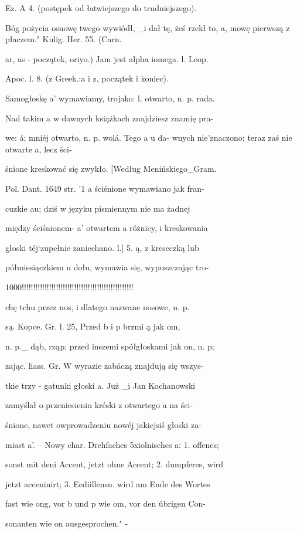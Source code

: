   Ez. A 4. (postępek od łatwiejszego do trudniejszego).

  Bóg pożycia osnowę twego wywiódł, _i dał tę, żeś rzekł
to,
  a, mowę pierwszą z płaczem." Kulig. Her. 55. (Carn.

  ar, as - początek, oriyo.) Jam jest alpha iomega. l. Leop.

  Apoc. l. 8. (z Greek.:a i z, początek i koniec).


Samogłoskę a' wymawiamy, trojako: l. otwarto, n. p. rada.

  Nad takim a w dawnych książkach znajdziesz znamię pra-

  we: á; mniéj otwarto, n. p. wolá.
Tego a u da-
  wnych nie'znaczono; teraz zaś nie otwarte a, lecz ści-

  śnione kreskować się zwykło. [Według Menińskiego_Gram.

  Pol. Dant. 1649 str. '1 a ściśnione wymawiano jak fran-

  cuzkie au; dziś w języku pismiennym nie ma żadnej

  między ściśnionem- a' otwartem a różnicy, i kreskowania

  głoski téj`zupełnie 	zaniechano. l.] 5. ą, z kreseczką lub

  półmiesiączkiem u dołu, wymawia się, wypuszczając tro-

  1000!!!!!!!!!!!!!!!!!!!!!!!!!!!!!!!!!!!!!!!!!!!!!!!!!

  chę tchu przez nos, i dlatego nazwane nosowe, n. p.

  są. Kopce. Gr. l. 25, Przed b i p brzmi ą jak om,

  n. p._ dąb, rząp; przed inszemi spółgłoskami jak on, n. p;

  zając. liass. Gr. W wyrazie zabáczą znajdują się wszys-

  tkie trzy - gatunki głoski a. Już _i Jan Kochanowski

  zamyślał o przeniesieniu kréski z otwartego a na ści-

  śnione, nawet owprowadzeniu nowéj jakiejsiś głoski za-

  miast a'. -- Nowy char. Drehfaches 5xiolnisches a: 1. offenes;

  sonst mit deni Accent, jetzt ohne Accent; 2. dumpferes, wird 

  jetzt acceninirt; 3. Eediillensn. wird am Ende des Wortes

  fast wie ong, vor b und p wie om, vor den übrigen Con-

  sonanten wie on ausgesprochen." -